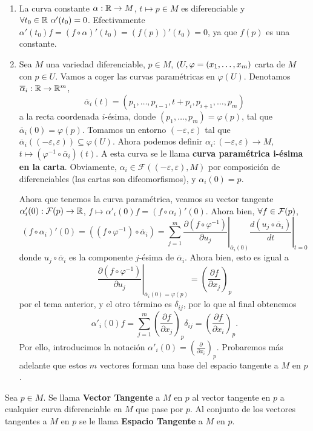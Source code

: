 \documentclass[Cursovd_portada.tex]{subfiles}
\begin{document}
\begin{ejs}\
\begin{enumerate}
\item La curva constante $\alpha:\mathbb{R}\to M$, $t\mapsto p\in M$ es diferenciable y $\forall t_0\in\R\ \alpha'(t_0)=0$. Efectivamente $\alpha'(t_0)f=(f\circ\alpha)'(t_0)=(f(p))'(t_0)=0$, ya que $f(p)$ es una constante.
\item Sea $M$ una variedad diferenciable, $p\in M$, $(U,\varphi=(x_1,\dotsc,x_{m})$ carta de $M$ con $p\in U$. Vamos a coger las curvas paramétricas en $\varphi(U)$. Denotamos $\overline{\alpha}_i:\mathbb{R}\to\mathbb{R}^m$, $$\overline{\alpha}_i(t)=(p_1,\dots,p_{i-1},t+p_i,p_{i+1},\dots,p_m)$$ a la recta coordenada $i$-ésima, donde $(p_1,\dots,p_m)=\varphi(p)$, tal que $\overline{\alpha}_i(0)=\varphi(p)$. Tomamos un entorno $(-\varepsilon,\varepsilon)$ tal que $\overline{\alpha}_i((-\varepsilon,\varepsilon))\subseteq\varphi(U)$. Ahora podemos definir $\alpha_i:(-\varepsilon,\varepsilon)\to M$, $t\mapsto (\varphi^{-1}\circ\overline{\alpha}_i)(t)$. A esta curva se le llama \textbf{curva paramétrica i-ésima en la carta}. Obviamente, $\alpha_i\in\mathcal{F}((-\varepsilon,\varepsilon),M)$ por composición de diferenciables (las cartas son difeomorfismos), y $\alpha_i(0)=p$.

Ahora que tenemos la curva paramétrica, veamos su vector tangente $\alpha'_i(0):\mathcal{F}(p)\to\mathbb{R}$, $f\mapsto \alpha'_i(0)f=(f\circ\alpha_i)'(0)$. Ahora bien, $\forall f\in\mathcal{F}(p)$, 
$$(f\circ\alpha_i)'(0)=((f\circ\varphi^{-1})\circ\overline{\alpha}_i)=\sum_{j=1}^m \left.\frac{\partial (f\circ\varphi^{-1})}{\partial u_j}\right|_{\overline{\alpha}_i(0)}\left.\frac{d(u_j\circ\overline{\alpha}_i)}{dt}\right|_{t=0}$$
donde $u_j\circ\overline{\alpha}_i$ es la componente $j$-ésima de $\overline{\alpha}_i$. Ahora bien, esto es igual a
$$
\left.\frac{\partial (f\circ\varphi^{-1})}{\partial u_j}\right|_{\overline{\alpha}_i(0)=\varphi(p)}=\left(\frac{\partial f}{\partial x_j}\right)_p
$$
por el tema anterior, y el otro término es $\delta_{ij}$, por lo que al final obtenemos
$$
\alpha'_i(0)f=\sum_{j=1}^m\left(\frac{\partial f}{\partial x_j}\right)_p\delta_{ij}=\left(\frac{\partial f}{\partial x_i}\right)_p.
$$
Por ello, introducimos la notación $\alpha'_i(0)=\left(\frac{\partial}{\partial x_i}\right)_p$. Probaremos más adelante que estos $m$ vectores forman una base del espacio tangente a $M$ en $p$.
\end{enumerate}
\end{ejs}

\begin{defi}
Sea $p\in M$. Se llama {\bf Vector Tangente} a $M$ en $p$ al vector tangente en $p$ a cualquier curva
diferenciable en $M$ que pase por $p$. Al conjunto de los vectores tangentes a $M$ en $p$ se le llama {\bf Espacio
Tangente} a $M$ en $p$.
\end{defi}
\end{document}

